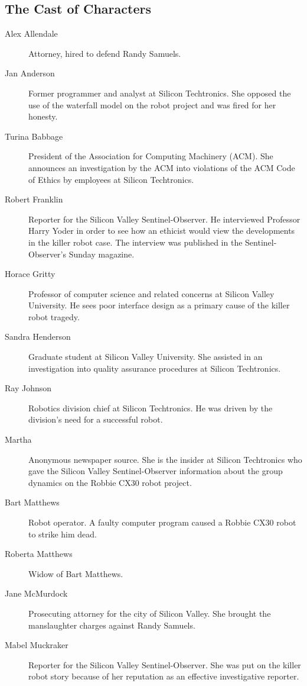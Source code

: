 \begin{center}
\section*{The Cast of Characters}
\end{center}

\begin{description}
\item[Alex Allendale] Attorney, hired to defend Randy Samuels.
\item[Jan Anderson] Former programmer and analyst at Silicon Techtronics. She opposed the use of the waterfall model on the robot project and was fired for her honesty.
\item[Turina Babbage] President of the Association for Computing Machinery (ACM). She announces an investigation by the ACM into violations of the ACM Code of Ethics by employees at Silicon Techtronics.
\item[Robert Franklin] Reporter for the Silicon Valley Sentinel-Observer. He interviewed Professor Harry Yoder in order to see how an ethicist would view the developments in the killer robot case. The interview was published in the Sentinel-Observer's Sunday magazine.
\item[Horace Gritty] Professor of computer science and related concerns at Silicon Valley University. He sees poor interface design as a primary cause of the killer robot tragedy.
\item[Sandra Henderson] Graduate student at Silicon Valley University. She assisted in an investigation into quality assurance procedures at Silicon Techtronics.
\item[Ray Johnson] Robotics division chief at Silicon Techtronics. He was driven by the division's need for a successful robot.
\item[Martha] Anonymous newspaper source. She is the insider at Silicon Techtronics who gave the Silicon Valley Sentinel-Observer information about the group dynamics on the Robbie CX30 robot project.
\item[Bart Matthews] Robot operator. A faulty computer program caused a Robbie CX30 robot to strike him dead.
\item[Roberta Matthews] Widow of Bart Matthews.
\item[Jane McMurdock] Prosecuting attorney for the city of Silicon Valley. She brought the manslaughter charges against Randy Samuels.
\item[Mabel Muckraker] Reporter for the Silicon Valley Sentinel-Observer. She was put on the killer robot story because of her reputation as an effective investigative reporter.

\end{description}
